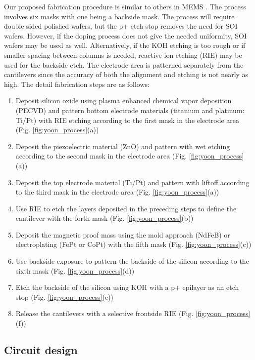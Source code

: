 Our proposed fabrication procedure is similar to others in MEMS \cite{shen2008design}. The process involves six masks with one being a backside mask. The process will require double sided polished wafers, but the p+ etch stop removes the need for SOI wafers. However, if the doping process does not give the needed uniformity, SOI wafers may be used as well. Alternatively, if the KOH etching is too rough or if smaller spacing between columns is needed, reactive ion etching (RIE) may be used for the backside etch. The electrode area is patterned separately from the cantilevers since the accuracy of both the alignment and etching is not nearly as high. The detail fabrication steps are as follows:
\begin{enumerate}
\item Deposit silicon oxide using plasma enhanced chemical vapor deposition (PECVD) and pattern bottom electrode materials (titanium and platinum: Ti/Pt) with RIE etching according to the first mask in the electrode area (Fig. \ref{fig:yoon_process}(a))
\item Deposit the piezoelectric material (ZnO) and pattern with wet etching according to the second mask in the electrode area (Fig. \ref{fig:yoon_process}(a))
\item Deposit the top electrode material (Ti/Pt) and pattern with liftoff according to the third mask in the electrode area (Fig. \ref{fig:yoon_process}(a)) 
\item Use RIE to etch the layers deposited in the preceding steps to define the cantilever with the forth mask (Fig. \ref{fig:yoon_process}(b))
\item Deposit the magnetic proof mass using the mold approach (NdFeB) or electroplating (FePt or CoPt) with the fifth mask (Fig. \ref{fig:yoon_process}(c))
\item Use backside exposure to pattern the backside of the silicon according to the sixth mask (Fig. \ref{fig:yoon_process}(d))
\item Etch the backside of the silicon using KOH with a p+ epilayer as an etch stop (Fig. \ref{fig:yoon_process}(e))
\item Release the cantilevers with a selective frontside RIE (Fig. \ref{fig:yoon_process}(f))
\end{enumerate}
\subsection{Circuit design}
 
